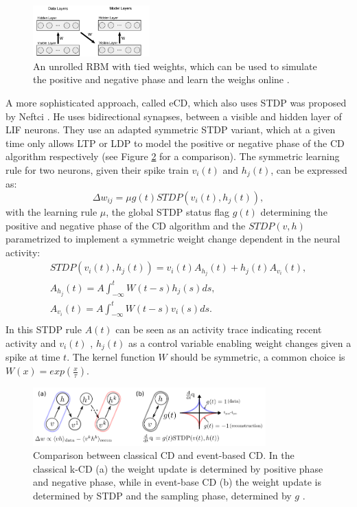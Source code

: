 \begin{figure}
	\centering
    	\includegraphics[width=0.4\textwidth]{imgs/evtCD.png} 
    \caption[An unrolled RBM with tied weights for CD.]{An unrolled RBM with tied weights, which can be used to simulate the positive and negative phase and learn the weighs online \cite{Neil2013}.}
	\label{fig:evtCD}
\end{figure}

A more sophisticated approach, called eCD, which also uses STDP was proposed by Neftci \cite{Neftci2013}.
He uses bidirectional synapses, between a visible and hidden layer of LIF neurons.
They use an adapted symmetric STDP variant, which at a given time only allows LTP or LDP to model the positive or negative phase of the CD algorithm respectively (see Figure \ref{fig:ecdcomp} for a comparison). 
The symmetric learning rule for two neurons, given their spike train $v_i(t)$ and $h_j(t)$, can be expressed as:
\[
\Delta w_{ij} = \mu g(t) STDP(v_i(t), h_j(t)),
\]
with the learning rule $\mu$, the global STDP status flag $g(t)$ determining the positive and negative phase of the CD algorithm and the $STDP(v, h)$ parametrized to implement a symmetric weight change dependent in the neural activity:
\[
\begin{split}
STDP(v_i(t), h_j(t)) = v_i(t) A_{h_j}(t) + h_j(t) A_{v_i}(t), \\
A_{h_j}(t) = A \int_{- \infty}^t W(t-s) h_j(s) ds, \\ 
A_{v_i}(t) = A \int_{- \infty}^t W(t-s) v_i(s) ds. \\ 
\end{split}
\]
In this STDP rule $A(t)$ can be seen as an activity trace indicating recent activity and $v_i(t)$ , $h_j(t)$ as a control variable enabling weight changes given a spike at time $t$.    
The kernel function $W$ should be symmetric, a common choice is $W(x) = exp(\frac{x}{\tau})$. 

\begin{figure}
	\centering
    	\includegraphics[width=0.8\textwidth]{imgs/eCD2.png} 
    \caption[Comparison between classical CD and event-based CD.]{Comparison between classical CD and event-based CD. In the classical k-CD (a) the weight update is determined by positive phase and negative phase, while in event-base CD (b) the weight update is determined by STDP and the sampling phase, determined by $g$ \cite{Neftci2013}.}
	\label{fig:ecdcomp}
\end{figure}
  
